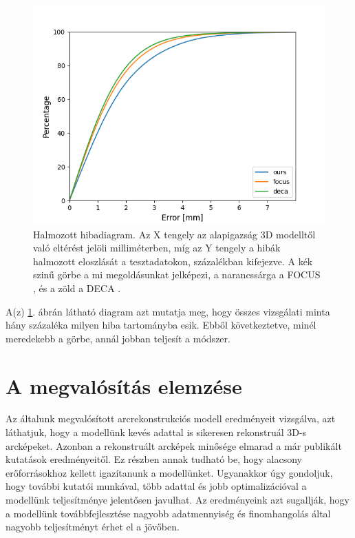 \documentclass[12pt,a4]{article}
\begin{document}
            \begin{figure}[h]	
    		      \centering
    		      \includegraphics[width=1\linewidth]{cummulative-error.png}
                \caption{Halmozott hibadiagram. Az X tengely az alapigazság 3D modelltől való eltérést jelöli milliméterben, míg az Y tengely a hibák halmozott eloszlását a tesztadatokon, százalékban kifejezve. A kék szinű görbe a mi megoldásunkat jelképezi, a narancssárga a FOCUS \cite{focus}, és a zöld a DECA \cite{deca}.}
                 \label{fig:cummulative-error}
    	    \end{figure} 

            A(z) \ref{fig:cummulative-error}. ábrán látható diagram azt mutatja meg, hogy összes vizsgálati minta hány százaléka milyen hiba tartományba esik. Ebből következtetve, minél meredekebb a görbe, annál jobban teljesít a módszer.
    
    \section{A megvalósítás elemzése}

        Az általunk megvalósított arcrekonstrukciós modell eredményeit vizsgálva, azt láthatjuk, hogy a modellünk kevés adattal is sikeresen rekonstruál 3D-s arcképeket. Azonban a rekonstruált arcképek minősége elmarad a már publikált kutatások eredményeitől. Ez részben annak tudható be, hogy alacsony erőforrásokhoz kellett igazítanunk a modellünket. Ugyanakkor úgy gondoljuk, hogy további kutatói munkával, több adattal és jobb optimalizációval a modellünk teljesítménye jelentősen javulhat. Az eredményeink azt sugallják, hogy a modellünk továbbfejlesztése nagyobb adatmennyiség és finomhangolás által nagyobb teljesítményt érhet el a jövőben. 
\end{document}
